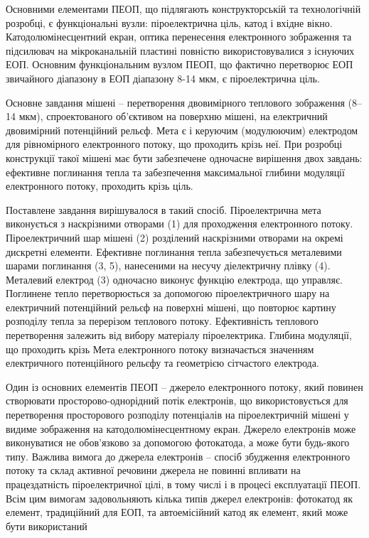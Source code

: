 \documentclass[a4paper,14pt]{extreport}
\begin{document}
Основними елементами ПЕОП, що підлягають конструкторській та
технологічній розробці, є функціональні вузли: піроелектрична ціль, катод і вхідне вікно. Катодолюмінесцентний екран, оптика перенесення електронного зображення та підсилювач
на мікроканальній пластині повністю використовувалися з існуючих ЕОП. Основним функціональним вузлом ПЕОП, що фактично перетворює ЕОП звичайного діапазону в ЕОП діапазону 8-14 мкм,
є піроелектрична ціль.\par
Основне завдання мішені – перетворення двовимірного теплового зображення (8–14 мкм), спроектованого об'єктивом на поверхню мішені, на електричний двовимірний потенційний рельєф. Мета є і керуючим (модулюючим) електродом
для рівномірного електронного потоку, що проходить крізь неї. При
розробці конструкції такої мішені має бути забезпечене одночасне вирішення двох завдань: ефективне поглинання тепла та
забезпечення максимальної глибини модуляції електронного потоку,
проходить крізь ціль.\par
 Поставлене завдання вирішувалося в такий спосіб. Піроелектрична мета виконується з наскрізними отворами (1) для проходження електронного потоку. Піроелектричний
шар мішені (2) розділений наскрізними отворами на окремі
дискретні елементи. Ефективне поглинання тепла забезпечується металевими шарами поглинання (3, 5), нанесеними на несучу діелектричну плівку (4). Металевий електрод (3) одночасно виконує функцію електрода, що управляє. Поглинене
тепло перетворюється за допомогою піроелектричного шару на електричний потенційний рельєф на поверхні мішені, що повторює
картину розподілу тепла за перерізом теплового потоку. Ефективність теплового перетворення залежить від вибору
матеріалу піроелектрика. Глибина модуляції, що проходить крізь
Мета електронного потоку визначається значенням електричного
потенційного рельєфу та геометрією сітчастого електрода.\par 
Один із основних елементів
ПЕОП – джерело електронного
потоку, який повинен створювати просторово-однорідний потік електронів, що використовується для перетворення просторового розподілу
потенціалів на піроелектричній мішені у видиме зображення на катодолюмінесцентному
екран. Джерело електронів може виконуватися не обов'язково за допомогою фотокатода, а може бути будь-якого типу. Важлива вимога до джерела електронів – спосіб збудження електронного потоку та склад активної речовини джерела не повинні впливати на працездатність піроелектричної
цілі, в тому числі і в процесі експлуатації ПЕОП. Всім цим
вимогам задовольняють кілька типів джерел електронів: фотокатод як елемент, традиційний для ЕОП, та автоемісійний катод як елемент, який може бути використаний
\end{document}
